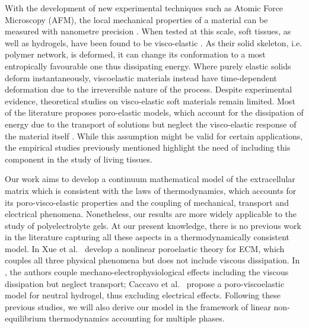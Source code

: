 With the development of new experimental techniques such as Atomic Force Microscopy (AFM), the local mechanical properties of a material can be measured with nanometre precision \cite{viscoporo}. When tested at this scale, soft tissues, as well as hydrogels, have been found to be visco-elastic \cite{ex5}. As their solid skeleton, i.e. polymer network, is deformed, it can change its conformation to a most entropically favourable one thus dissipating energy. Where purely elastic solids deform instantaneously, viscoelastic materials instead have time-dependent deformation due to the irreversible nature of the process. 
Despite experimental evidence, theoretical studies on visco-elastic soft materials remain limited. Most of the literature proposes poro-elastic models, which account for the dissipation of energy due to the transport of solutions but neglect the visco-elastic response of the material itself \cite{Article1}. While this assumption might be valid for certain applications, the empirical studies previously mentioned highlight the need of including this component in the study of living tissues. 

Our work aims to develop a continuum mathematical model of the extracellular matrix which is consistent with the laws of thermodynamics, which accounts for its poro-visco-elastic properties and the coupling of mechanical, transport and electrical phenomena. Nonetheless, our results are more widely applicable to the study of polyelectrolyte gels. At our present knowledge, there is no previous work in the literature capturing all these aspects in a thermodynamically consistent model. In \cite{ecm1,ecm2} Xue et al.~ develop a nonlinear poroelastic theory for ECM, which couples all three physical phenomena but does not include viscous dissipation. In \cite{Jeru}, the authors couple mechano-electrophysiological effects including the viscous dissipation but neglect transport; Caccavo et al.~ \cite{Article1} propose a poro-viscoelastic model for neutral hydrogel, thus excluding electrical effects. Following these previous studies, we will also derive our model in the framework of linear non-equilibrium thermodynamics \cite{NET} accounting for multiple phases.

